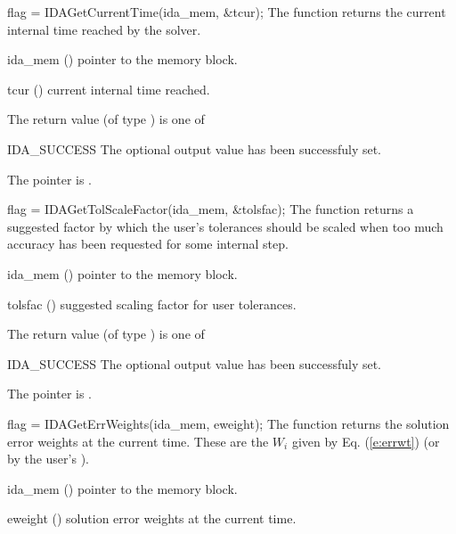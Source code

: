 {{
  flag = IDAGetCurrentTime(ida\_mem, \&tcur);
}
{
  The function  returns the
  current internal time reached by the solver.
}
{
  \begin{args}
  \item[ida\_mem] ()
    pointer to the {\ida} memory block.
  \item[tcur] ()
    current internal time reached.
  \end{args}
}
{
  The return value  (of type ) is one of
  \begin{args}
  \item[IDA\_SUCCESS] 
    The optional output value has been successfuly set.
  \item[\Id{IDA\_MEM\_NULL}]
    The  pointer is .
  \end{args}
}
{}
{
  flag = IDAGetTolScaleFactor(ida\_mem, \&tolsfac);
}
{
  The function  returns a
  suggested factor by which the user's tolerances 
  should be scaled when too much accuracy has been 
  requested for some internal step.
}
{
  \begin{args}[tolsfac]
  \item[ida\_mem] ()
    pointer to the {\ida} memory block.
  \item[tolsfac] ()
    suggested scaling factor for user tolerances.
  \end{args}
}
{
  The return value  (of type ) is one of
  \begin{args}
  \item[IDA\_SUCCESS] 
    The optional output value has been successfuly set.
  \item[\Id{IDA\_MEM\_NULL}]
    The  pointer is .
  \end{args}
}
{}
{
  flag = IDAGetErrWeights(ida\_mem, eweight);
}
{
  The function  returns the solution error weights 
  at the current time. These are the $W_i$ given by Eq. (\ref{e:errwt})
  (or by the user's ).
}
{
  \begin{args}[eweight]
  \item[ida\_mem] ()
    pointer to the {\ida} memory block.
  \item[eweight] ()
    solution error weights at the current time.
  \end{args}
}}

